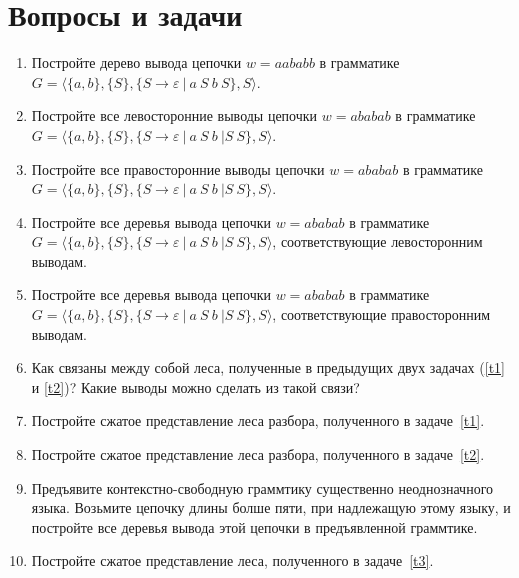 \section{Вопросы и задачи}
\begin{enumerate}
  \item Постройте дерево вывода цепочки $w=aababb$ в грамматике $G=\langle\{a,b\},\{S\},\{S\rightarrow \varepsilon \ | \ a \ S \ b \ S \}, S \rangle$.
  \item Постройте все левосторонние выводы цепочки $w=ababab$ в грамматике $G=\langle\{a,b\},\{S\},\{S\rightarrow \varepsilon \ | \ a \ S \ b \ | S \ S\}, S \rangle$.
  \item Постройте все правосторонние выводы цепочки $w=ababab$ в грамматике $G=\langle\{a,b\},\{S\},\{S\rightarrow \varepsilon \ | \ a \ S \ b \ | S \ S\}, S \rangle$.
  \item \label{t1}Постройте все деревья вывода цепочки $w=ababab$ в грамматике $G=\langle\{a,b\},\{S\},\{S\rightarrow \varepsilon \ | \ a \ S \ b \ | S \ S\}, S \rangle$, соответствующие левосторонним выводам.
  \item \label{t2}Постройте все деревья вывода цепочки $w=ababab$ в грамматике $G=\langle\{a,b\},\{S\},\{S\rightarrow \varepsilon \ | \ a \ S \ b \ | S \ S\}, S \rangle$, соответствующие правосторонним выводам.
  \item Как связаны между собой леса, полученные в предыдущих двух задачах (\ref{t1} и \ref{t2})? Какие выводы можно сделать из такой связи?
  \item Постройте сжатое представление леса разбора, полученного в задаче~\ref{t1}.
  \item Постройте сжатое представление леса разбора, полученного в задаче~\ref{t2}.
  \item \label{t3}Предъявите контекстно-свободную граммтику существенно неоднозначного языка. 
        Возьмите цепочку длины болше пяти, при надлежащую этому языку, и постройте все деревья вывода этой цепочки в предъявленной граммтике. 
  \item Постройте сжатое представление леса, полученного в задаче~\ref{t3}.
\end{enumerate}
